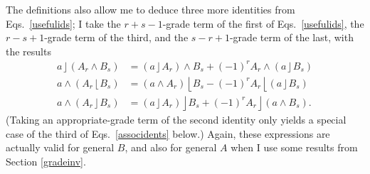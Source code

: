 \documentclass{utarticle}
\DeclareMathOperator{\lin}{\rfloor}
\DeclareMathOperator{\rin}{\lfloor}
\DeclareMathOperator{\out}{\wedge}
\begin{document}
The definitions also allow me to deduce three more identities from Eqs.~\eqref{usefulids}; 
I take the $r+s-1$-grade term of the first of Eqs.~\eqref{usefulids}, the 
$r-s+1$-grade term of the third, and the $s-r+1$-grade term of the last, with 
the results
\begin{align}
a \lin (A_r \out B_s) & = (a \lin A_r) \out B_s + (-1)^r A_r \out 
                              (a \lin B_s) \nonumber \\
a \out (A_r \rin B_s) & = (a \out A_r) \rin B_s - (-1)^r A_r \rin 
                              (a \lin B_s) \nonumber \\
a \out (A_r \lin B_s) & = (a \lin A_r) \lin B_s + (-1)^r A_r \lin 
                              (a \out B_s).
\label{contwedgeids}
\end{align}
(Taking an appropriate-grade term of the second identity only yields a special 
case of the third of Eqs.~\eqref{associdents} below.)  Again, these expressions 
are actually valid for general $B$, and also for general $A$ when I use some 
results from Section \ref{gradeinv}.
\end{document}
